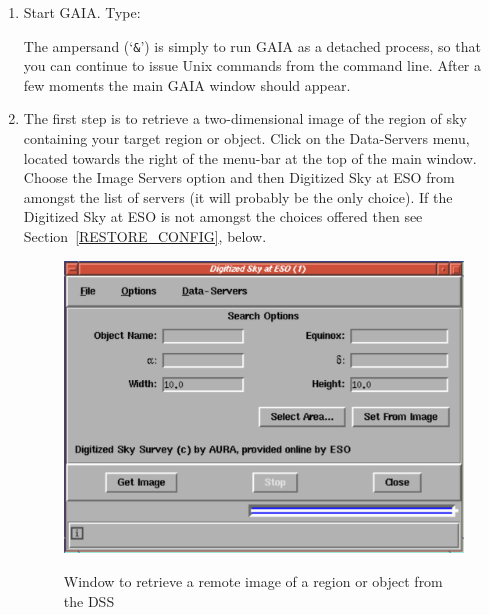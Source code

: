 \documentclass[twoside,11pt]{starlink}
\begin{document}
\begin{enumerate}

  \item Start GAIA.  Type:

  \begin{terminalv}
  \end{terminalv}

   The ampersand (`\texttt{\&}') is simply to run GAIA as a detached process,
   so that you can continue to issue Unix commands from the command line.
   After a few moments the main GAIA window should appear.

  \item The first step is to retrieve a two-dimensional image of the
   region of sky containing your target region or object.  Click on the
   \textsf{Data-Servers} menu, located towards the right of the menu-bar at
   the top of the main window.  Choose the \textsf{Image Servers} option and
   then \textsf{Digitized Sky at ESO} from amongst the list of servers (it
   will probably be the only choice).  If the \textsf{Digitized Sky at ESO}
   is not amongst the choices offered then see
   Section~\ref{RESTORE_CONFIG}, below.

  \begin{figure}[htbp]
     \centering
     \includegraphics[totalheight=3in]{sc17_retriev_r_dss}
     \begin{quote}
     \caption[Window to retrieve a remote image]
      {Window to retrieve a remote image of a region or object from the
      DSS
     \label{RETRIEV_R_DSS} }
     \end{quote}
  \end{figure}


\end{enumerate}
\end{document}
